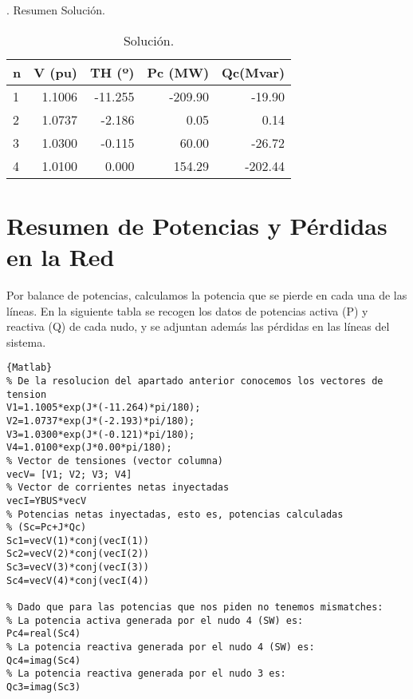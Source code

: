 \documentclass[a4paper,10pt,titlepage,oneside]{article}
\begin{document}
{. Resumen Solución.
\begin{table}[htbp]
    \centering
    \begin{tabular}[c]{l r r r r} 
        n  &  V (pu)    & TH (º)  &  Pc (MW)  & Qc(Mvar)\\
        \hline
        \rowcolor[gray]{0.8} 1   & 1.1006  & -11.255 &   -209.90    & -19.90\\
        \hline
        \rowcolor[gray]{0.6} 2   & 1.0737 &   -2.186  &     0.05   &    0.14\\
        \hline
        \rowcolor[gray]{0.8} 3   & 1.0300&    -0.115   &   60.00  &   -26.72\\
        \hline
        \rowcolor[gray]{0.6} 4   & 1.0100    & 0.000    & 154.29 &   -202.44\\
        \hline
    \end{tabular}
   \caption{Solución.}
\end{table}

\section{Resumen de Potencias y Pérdidas en la Red}
Por balance de potencias, calculamos la potencia que se pierde en cada una de las líneas.
En la siguiente tabla se recogen los datos de potencias activa (P) y reactiva (Q) de cada nudo, y se adjuntan además las pérdidas en las líneas del sistema.
\lstset{language=Matlab, breaklines=true}
\begin{lstlisting}[frame=lines]{Matlab}
% De la resolucion del apartado anterior conocemos los vectores de tension
V1=1.1005*exp(J*(-11.264)*pi/180);
V2=1.0737*exp(J*(-2.193)*pi/180);
V3=1.0300*exp(J*(-0.121)*pi/180);
V4=1.0100*exp(J*0.00*pi/180);
% Vector de tensiones (vector columna)
vecV= [V1; V2; V3; V4]
% Vector de corrientes netas inyectadas
vecI=YBUS*vecV
% Potencias netas inyectadas, esto es, potencias calculadas
% (Sc=Pc+J*Qc)
Sc1=vecV(1)*conj(vecI(1))
Sc2=vecV(2)*conj(vecI(2))
Sc3=vecV(3)*conj(vecI(3))
Sc4=vecV(4)*conj(vecI(4))

% Dado que para las potencias que nos piden no tenemos mismatches:
% La potencia activa generada por el nudo 4 (SW) es:
Pc4=real(Sc4)
% La potencia reactiva generada por el nudo 4 (SW) es:
Qc4=imag(Sc4)
% La potencia reactiva generada por el nudo 3 es:
Qc3=imag(Sc3)


\end{lstlisting}}
\end{document}
